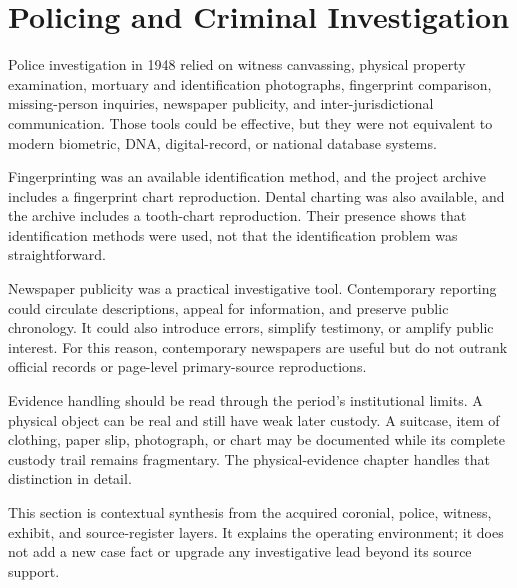 \section{Policing and Criminal Investigation}

Police investigation in 1948 relied on witness canvassing, physical property examination, mortuary and identification photographs, fingerprint comparison, missing-person inquiries, newspaper publicity, and inter-jurisdictional communication. Those tools could be effective, but they were not equivalent to modern biometric, DNA, digital-record, or national database systems.

Fingerprinting was an available identification method, and the project archive includes a fingerprint chart reproduction. Dental charting was also available, and the archive includes a tooth-chart reproduction. Their presence shows that identification methods were used, not that the identification problem was straightforward.

Newspaper publicity was a practical investigative tool. Contemporary reporting could circulate descriptions, appeal for information, and preserve public chronology. It could also introduce errors, simplify testimony, or amplify public interest. For this reason, contemporary newspapers are useful but do not outrank official records or page-level primary-source reproductions.

Evidence handling should be read through the period's institutional limits. A physical object can be real and still have weak later custody. A suitcase, item of clothing, paper slip, photograph, or chart may be documented while its complete custody trail remains fragmentary. The physical-evidence chapter handles that distinction in detail.

This section is contextual synthesis from the acquired coronial, police, witness, exhibit, and source-register layers. It explains the operating environment; it does not add a new case fact or upgrade any investigative lead beyond its source support.

